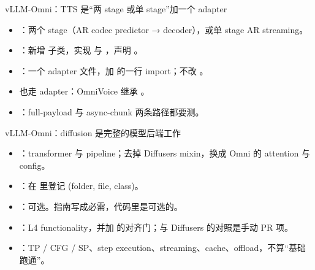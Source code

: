 \begin{frame}[t]{vLLM-Omni：TTS 是“两 stage 或单 stage”加一个 adapter}
\small
\begin{itemize}
  \item {}：两个 stage（AR codec predictor → decoder），或单 stage AR streaming。
  \item {}：新增  子类，实现  与 ，声明 。
  \item {}：一个 adapter 文件，加  的一行 import；不改 。
  \item {}也走 adapter：OmniVoice 继承 。
  \item {}：full-payload 与 async-chunk 两条路径都要测。
\end{itemize}
\vspace{4pt}
\end{frame}

\begin{frame}[t]{vLLM-Omni：diffusion 是完整的模型后端工作}
\small
\begin{itemize}
  \item {}：transformer 与 pipeline；去掉 Diffusers mixin，换成 Omni 的 attention 与 config。
  \item {}：在  里登记 (folder, file, class)。
  \item {}：可选。指南写成必需，代码里是可选的。
  \item {}：L4 functionality，并加  的对齐门；与 Diffusers 的对照是手动 PR 项。
  \item {}：TP / CFG / SP、step execution、streaming、cache、offload，不算“基础跑通”。
\end{itemize}
\vspace{4pt}
\end{frame}

